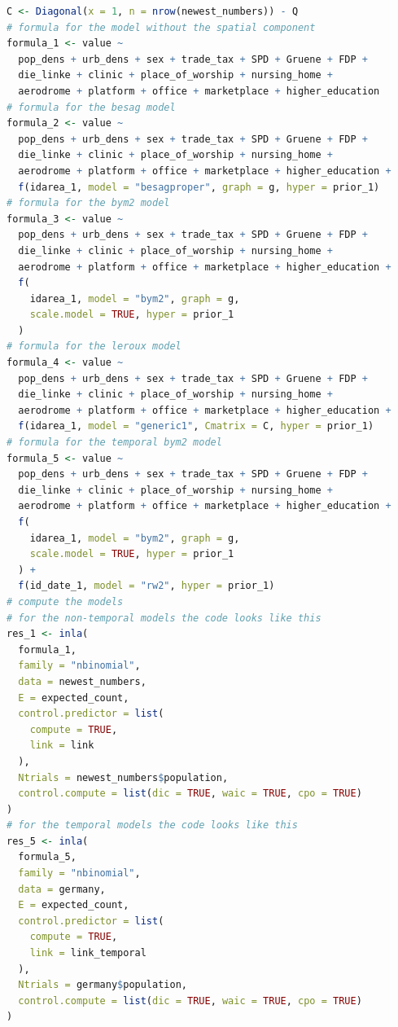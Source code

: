 \begin{lstlisting}[caption={Specifying different models in INLA.}, label={codeModels}, language=R]
C <- Diagonal(x = 1, n = nrow(newest_numbers)) - Q
# formula for the model without the spatial component
formula_1 <- value ~
  pop_dens + urb_dens + sex + trade_tax + SPD + Gruene + FDP +
  die_linke + clinic + place_of_worship + nursing_home +
  aerodrome + platform + office + marketplace + higher_education
# formula for the besag model
formula_2 <- value ~
  pop_dens + urb_dens + sex + trade_tax + SPD + Gruene + FDP +
  die_linke + clinic + place_of_worship + nursing_home +
  aerodrome + platform + office + marketplace + higher_education +
  f(idarea_1, model = "besagproper", graph = g, hyper = prior_1)
# formula for the bym2 model
formula_3 <- value ~
  pop_dens + urb_dens + sex + trade_tax + SPD + Gruene + FDP +
  die_linke + clinic + place_of_worship + nursing_home +
  aerodrome + platform + office + marketplace + higher_education +
  f(
    idarea_1, model = "bym2", graph = g,
    scale.model = TRUE, hyper = prior_1
  )
# formula for the leroux model
formula_4 <- value ~
  pop_dens + urb_dens + sex + trade_tax + SPD + Gruene + FDP +
  die_linke + clinic + place_of_worship + nursing_home +
  aerodrome + platform + office + marketplace + higher_education +
  f(idarea_1, model = "generic1", Cmatrix = C, hyper = prior_1)
# formula for the temporal bym2 model
formula_5 <- value ~
  pop_dens + urb_dens + sex + trade_tax + SPD + Gruene + FDP +
  die_linke + clinic + place_of_worship + nursing_home +
  aerodrome + platform + office + marketplace + higher_education +
  f(
    idarea_1, model = "bym2", graph = g,
    scale.model = TRUE, hyper = prior_1
  ) +
  f(id_date_1, model = "rw2", hyper = prior_1)
# compute the models
# for the non-temporal models the code looks like this
res_1 <- inla(
  formula_1,
  family = "nbinomial",
  data = newest_numbers,
  E = expected_count,
  control.predictor = list(
    compute = TRUE,
    link = link
  ),
  Ntrials = newest_numbers$population,
  control.compute = list(dic = TRUE, waic = TRUE, cpo = TRUE)
)
# for the temporal models the code looks like this
res_5 <- inla(
  formula_5,
  family = "nbinomial",
  data = germany,
  E = expected_count,
  control.predictor = list(
    compute = TRUE,
    link = link_temporal
  ),
  Ntrials = germany$population,
  control.compute = list(dic = TRUE, waic = TRUE, cpo = TRUE)
)
\end{lstlisting}
